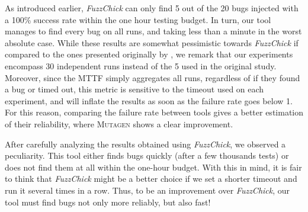 \documentclass[sigconf,review,anonymous]{acmart}
\newcommand{\fuzzchick}{\textit{FuzzChick}\xspace}
\newcommand{\mutagen}{\textsc{Mutagen}\xspace}
\begin{document}
As introduced earlier, \fuzzchick can only find 5 out of the 20 bugs injected
with a 100\% success rate within the one hour testing budget.
%
In turn, our tool manages to find every bug on all runs, and taking less than a
minute in the worst absolute case.
%
While these results are somewhat pessimistic towards \fuzzchick if compared to
the ones presented originally by \citeauthor{lampropoulos2019coverage}, we
remark that our experiments encompass 30 independent runs instead of the 5 used
in the original study.
%
Moreover, since the MTTF simply aggregates all runs, regardless of if they found
a bug or timed out, this metric is sensitive to the timeout used on each
experiment, and will inflate the results as soon as the failure rate goes below
1.
%
For this reason, comparing the failure rate between tools gives a better
estimation of their reliability, where \mutagen shows a clear improvement.

After carefully analyzing the results obtained using \fuzzchick, we observed a
peculiarity.
%
This tool either finds bugs quickly (after a few thousands tests) or does not
find them at all within the one-hour budget.
%
With this in mind, it is fair to think that \fuzzchick might be a better choice
if we set a shorter timeout and run it several times in a row.
%
Thus, to be an improvement over \fuzzchick, our tool must find bugs not only
more reliably, but also fast!
\end{document}
